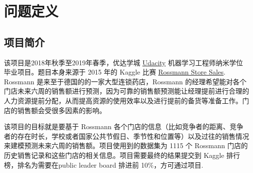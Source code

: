 \documentclass[a4paper]{article}
\begin{document}


\section{问题定义} \label{overview}%
\subsection{项目简介}
该项目是2018年秋季至2019年春季，优达学城  \href{https://www.udacity.com/}{Udacity} 机器学习工程师纳米学位毕业项目。题目本身来源于 2015 年的 Kaggle 比赛 \href{https://www.kaggle.com/c/rossmann-store-sales}{Rossmann Store Sales}. Rossmann 是来至于德国的的一家大型连锁药店，Rossmann 的经理希望能对各个门店未来六周的销售额进行预测，因为可靠的销售额预测能让经理提前进行合理的人力资源提前分配，从而提高资源的使用效率以及进行提前的备货等准备工作。门店的销售额会受很多因素的影响。

该项目的目标就是要基于 Rossmann 各个门店的信息（比如竞争者的距离、竞争者的存在时长，学校或者国家公共节假日、季节性和位置等）以及过往的销售情况来建模预测未来六周的销售额。项目使用到的数据集为 1115 个 Rossmann 门店的历史销售记录和这些门店的相关信息。项目需要最终的结果提交到 Kaggle 排行榜，排名为需要在public leader board 排进前 10\%，方可通过项目.
\end{document}
